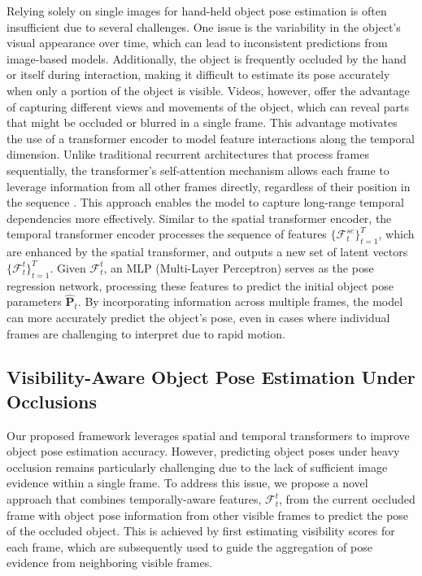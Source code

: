 Relying solely on single images for hand-held object pose estimation is often insufficient due to several challenges. One issue is the variability in the object's visual appearance over time, which can lead to inconsistent predictions from image-based models. Additionally, the object is frequently occluded by the hand or itself during interaction, making it difficult to estimate its pose accurately when only a portion of the object is visible. Videos, however, offer the advantage of capturing different views and movements of the object, which can reveal parts that might be occluded or blurred in a single frame. This advantage motivates the use of a transformer encoder to model feature interactions along the temporal dimension. Unlike traditional recurrent architectures that process frames sequentially, the transformer's self-attention mechanism allows each frame to leverage information from all other frames directly, regardless of their position in the sequence \cite{vaswani2017attention}. This approach enables the model to capture long-range temporal dependencies more effectively. Similar to the spatial transformer encoder, the temporal transformer encoder processes the sequence of features $\lbrace\mathcal{F}^{se}_t\rbrace_{t=1}^{T}$, which are enhanced by the spatial transformer, and outputs a new set of latent vectors $\lbrace\mathcal{F}^{t}_t\rbrace_{t=1}^{T}$. Given $\mathcal{F}^t_t$, an MLP (Multi-Layer Perceptron) serves as the pose regression network, processing these features to predict the initial object pose parameters $\hat{\mathbf{P}}_t$. By incorporating information across multiple frames, the model can more accurately predict the object's pose, even in cases where individual frames are challenging to interpret due to rapid motion. 

\subsection{Visibility-Aware Object Pose Estimation Under Occlusions}

Our proposed framework leverages spatial and temporal transformers to improve object pose estimation accuracy. However, predicting object poses under heavy occlusion remains particularly challenging due to the lack of sufficient image evidence within a single frame. To address this issue, we propose a novel approach that combines temporally-aware features, $\mathcal{F}^t_t$, from the current occluded frame with object pose information from other visible frames to predict the pose of the occluded object. This is achieved by first estimating visibility scores for each frame, which are subsequently used to guide the aggregation of pose evidence from neighboring visible frames.

